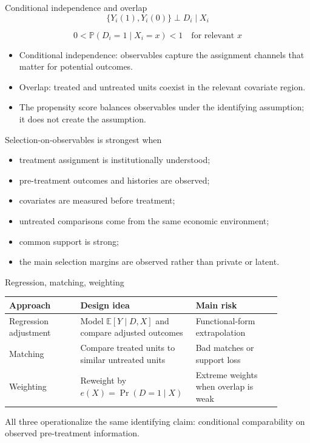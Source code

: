 \documentclass[aspectratio=169,11pt]{beamer}
\newcommand{\E}{\mathbb{E}}
\newcommand{\Prb}{\mathbb{P}}
\begin{document}
\begin{frame}{Conditional independence and overlap}
\[
\{Y_i(1),Y_i(0)\} \perp D_i \mid X_i
\]

\[
0 < \Prb(D_i=1\mid X_i=x) < 1
\quad \text{for relevant } x
\]

\begin{itemize}
    \item Conditional independence: observables capture the assignment channels that matter for potential outcomes.
    \item Overlap: treated and untreated units coexist in the relevant covariate region.
    \item The propensity score balances observables under the identifying assumption; it does not create the assumption.
\end{itemize}
\end{frame}

\begin{frame}{Selection-on-observables is strongest when}
\begin{itemize}
    \item treatment assignment is institutionally understood;
    \item pre-treatment outcomes and histories are observed;
    \item covariates are measured before treatment;
    \item untreated comparisons come from the same economic environment;
    \item common support is strong;
    \item the main selection margins are observed rather than private or latent.
\end{itemize}
\end{frame}

\begin{frame}{Regression, matching, weighting}
\small
\begin{tabular}{p{0.25\linewidth} p{0.34\linewidth} p{0.30\linewidth}}
\toprule
Approach & Design idea & Main risk \\
\midrule
Regression adjustment & Model $\E[Y\mid D,X]$ and compare adjusted outcomes & Functional-form extrapolation \\
Matching & Compare treated units to similar untreated units & Bad matches or support loss \\
Weighting & Reweight by $e(X)=\Pr(D=1\mid X)$ & Extreme weights when overlap is weak \\
\bottomrule
\end{tabular}

\medskip
All three operationalize the same identifying claim: conditional comparability on observed pre-treatment information.
\end{frame}
\end{document}
